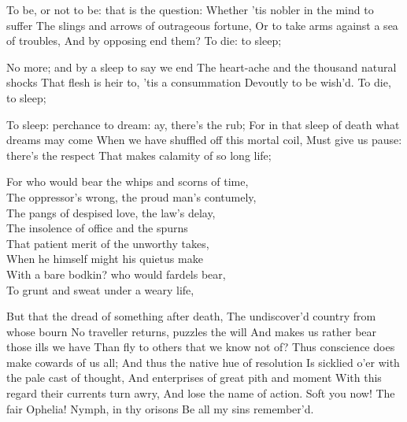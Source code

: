\documentclass{article}
\begin{document}
    To be, or not to be: that is the question:
    Whether 'tis                nobler                 in           the mind to suffer The slings and arrows of outrageous fortune,
    Or 	to 	take 	arms 	against 	a 	sea 	of 	troubles, 	And by 	opposing 	end them? 	To 	die: 	to sleep;

    No more; and by a sleep to say we end
    The heart-ache and the thousand natural shocks
    That flesh is heir to, 'tis a consummation
    Devoutly to be wish'd. To die, to sleep;

    To sleep: perchance to dream: ay, there's the rub;
    For in that sleep of death what dreams may come
    When we have shuffled off this mortal coil,
    Must give us pause: there's the respect
    That makes calamity of so long life;

    For who would bear the whips and scorns of time,\\
    The oppressor's wrong, the proud man's contumely,\\
    The pangs of despised love, the law's delay,\\
    The insolence of office and the spurns\\
    That patient merit of the unworthy takes,\\
    When he himself might his quietus make\\
    With a bare bodkin? who would fardels bear,\\
    To grunt and sweat under a weary life,

    But that the dread of something after death,
    The undiscover'd country from whose bourn
    No traveller returns, puzzles the will
    And makes us rather bear those ills we have
    Than fly to others that we know not of?
    Thus conscience does make cowards of us all;
    And thus the native hue of resolution
    Is sicklied o'er with the pale cast of thought,
    And enterprises of great pith and moment
    With this regard their currents turn awry,
    And lose the name of action. Soft you now!
    The fair Ophelia! Nymph, in thy orisons
    Be all my sins remember'd.


\end{document}
